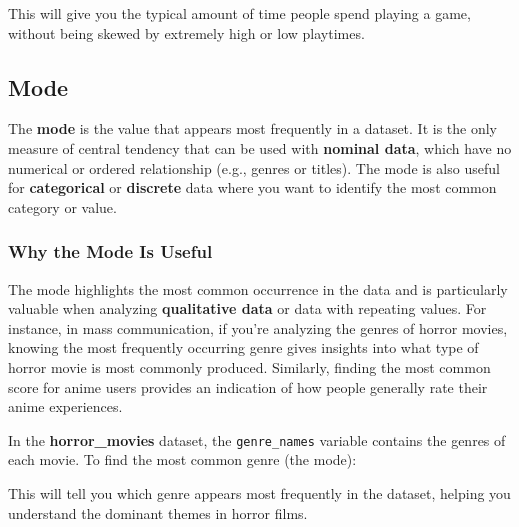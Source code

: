 \documentclass[
]{book}
\newenvironment{Shaded}{\begin{snugshade}}{\end{snugshade}}
\newcommand{\CommentTok}[1]{\textcolor[rgb]{0.56,0.35,0.01}{\textit{#1}}}
\newcommand{\FunctionTok}[1]{\textcolor[rgb]{0.13,0.29,0.53}{\textbf{#1}}}
\newcommand{\NormalTok}[1]{#1}
\newcommand{\OtherTok}[1]{\textcolor[rgb]{0.56,0.35,0.01}{#1}}
\newcommand{\SpecialCharTok}[1]{\textcolor[rgb]{0.81,0.36,0.00}{\textbf{#1}}}
\begin{document}
This will give you the typical amount of time people spend playing a game, without being skewed by extremely high or low playtimes.

\subsection*{Mode}\label{mode}

The \textbf{mode} is the value that appears most frequently in a dataset. It is the only measure of central tendency that can be used with \textbf{nominal data}, which have no numerical or ordered relationship (e.g., genres or titles). The mode is also useful for \textbf{categorical} or \textbf{discrete} data where you want to identify the most common category or value.

\subsubsection*{Why the Mode Is Useful}\label{why-the-mode-is-useful}

The mode highlights the most common occurrence in the data and is particularly valuable when analyzing \textbf{qualitative data} or data with repeating values. For instance, in mass communication, if you're analyzing the genres of horror movies, knowing the most frequently occurring genre gives insights into what type of horror movie is most commonly produced. Similarly, finding the most common score for anime users provides an indication of how people generally rate their anime experiences.

In the \textbf{horror\_movies} dataset, the \texttt{genre\_names} variable contains the genres of each movie. To find the most common genre (the mode):

\begin{Shaded}
\end{Shaded}

This will tell you which genre appears most frequently in the dataset, helping you understand the dominant themes in horror films.
\end{document}
